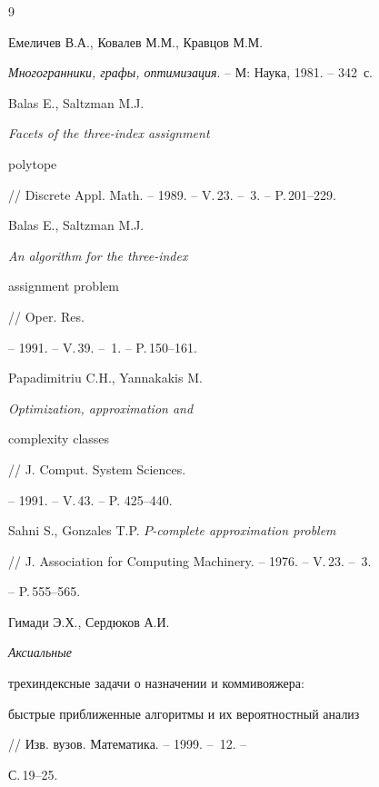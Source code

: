 \begin{thebibliography}{9}







Емеличев В.А., Ковалев М.М., Кравцов М.М.


{\em Многогранники, графы, оптимизация}. -- М: Наука, 1981. -- 342~с.




Balas E., Saltzman M.J. {\em Facets of the three-index assignment


polytope}


// Discrete Appl. Math. -- 1989. -- V.\,23. -- \No\,3. -- P.\,201--229.




Balas E., Saltzman M.J.{\em An algorithm for the three-index


assignment problem} // Oper. Res.


-- 1991. -- V.\,39. -- \No\,1. -- P.\,150--161.




Papadimitriu C.H., Yannakakis M. {\em Optimization, approximation and


complexity classes}


// J. Comput. System Sciences.


-- 1991. -- V.\,43. -- P. 425--440.




Sahni S., Gonzales T.P. {\em $P$-complete approximation problem}


// J. Association for Computing Machinery. -- 1976. -- V.\,23. -- \No\,3.


-- P.\,555--565.




Гимади Э.Х., Сердюков А.И. {\em Аксиальные 


трехиндексные задачи о назначении и коммивояжера:


быстрые приближенные алгоритмы и их вероятностный анализ}


// Изв. вузов. Математика. -- 1999. -- \No\,12. --


С.\,19--25.








\end{thebibliography}





\vskip 2cm









\smallskip







\label{end}





